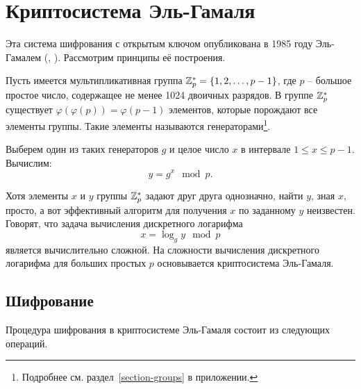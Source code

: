 \section{Криптосистема Эль-Гамаля}

Эта система шифрования с открытым ключом опубликована в 1985 году Эль-Гамалем (, \cite{ElGamal:1984, ElGamal:1985}). Рассмотрим принципы её построения.

Пусть имеется мультипликативная группа $\mathbb{Z}_p^* = \{1, 2, \dots, p-1\}$, где $p$ -- большое простое число, содержащее не менее 1024 двоичных разрядов. В группе $\mathbb{Z}_p^*$ существует $\varphi( \varphi( p ) ) = \varphi( p - 1 )$ элементов, которые порождают все элементы группы. Такие элементы называются генераторами\footnote{Подробнее см. раздел~\ref{section-groups} в приложении.}.

Выберем один из таких генераторов $g$ и целое число $x$ в интервале $1 \leq x \leq p-1$. Вычислим:
    \[ y = g^x \mod p. \]

Хотя элементы $x$ и $y$ группы $\mathbb{Z}_p^*$ задают друг друга однозначно, найти $y$, зная $x$, просто, а вот эффективный алгоритм для получения $x$ по заданному $y$ неизвестен. Говорят, что задача вычисления дискретного логарифма
	\[ x = \log_g y \mod p \]
является вычислительно сложной. На сложности вычисления дискретного логарифма для больших простых $p$ основывается криптосистема Эль-Гамаля.

\subsection{Шифрование}

Процедура шифрования в криптосистеме Эль-Гамаля состоит из следующих операций.

